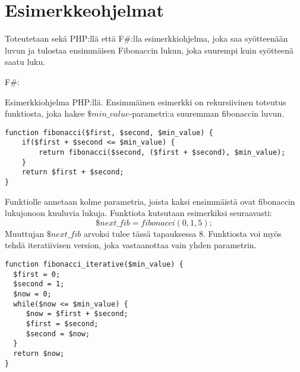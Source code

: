 \section{Esimerkkeohjelmat}


\lstset{
	language=FSharp,
	basicstyle=\ttfamily,
	breaklines=true,
	columns=fullflexible
}

Toteutetaan sekä PHP:llä että F\#:lla esimerkkiohjelma, joka saa syötteenään luvun ja tulostaa ensimmäisen Fibonaccin lukun, joka suurempi kuin syötteenä saatu luku.
\par
F\#:

\par
Esimerkkiohjelma PHP:llä. Ensimmäinen esimerkki on rekursiivinen toteutus funktiosta, joka hakee $\$min\_value$-parametri:a suuremman fibonaccin luvun. 

\lstset{language=PHP,
	basicstyle=\ttfamily,
	breaklines=true,
	columns=fullflexible}
\begin{lstlisting}
function fibonacci($first, $second, $min_value) {
    if($first + $second <= $min_value) {
        return fibonacci($second, ($first + $second), $min_value);
    }
    return $first + $second;
}
\end{lstlisting}

Funktiolle annetaan kolme parametria, joista kaksi ensimmäistä ovat fibonaccin lukujonoon kuuluvia lukuja. Funktiota kutsutaan esimerkiksi seuraavasti:
\[ \$next\_fib = fibonacci(0, 1, 5); \]
Muuttujan $\$next\_fib$ arvoksi tulee tässä tapauksessa 8.
Funktiosta voi myös tehdä iteratiivisen version, joka vastaanottaa vain yhden parametrin.

\begin{lstlisting}
function fibonacci_iterative($min_value) {
  $first = 0;
  $second = 1;
  $now = 0;
  while($now <= $min_value) {
     $now = $first + $second;
     $first = $second;
     $second = $now;
  }
  return $now;
}
\end{lstlisting}
